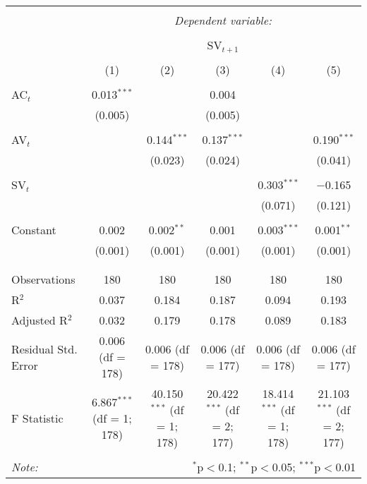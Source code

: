 
\begin{table}[!htbp] \centering 
  \caption{} 
  \label{} 
\begin{tabular}{@{\extracolsep{5pt}}lccccc} 
\\[-1.8ex]\hline 
\hline \\[-1.8ex] 
 & \multicolumn{5}{c}{\textit{Dependent variable:}} \\ 
\cline{2-6} 
\\[-1.8ex] & \multicolumn{5}{c}{SV$_{t+1}$} \\ 
\\[-1.8ex] & (1) & (2) & (3) & (4) & (5)\\ 
\hline \\[-1.8ex] 
 AC$_{t}$ & 0.013$^{***}$ &  & 0.004 &  &  \\ 
  & (0.005) &  & (0.005) &  &  \\ 
  & & & & & \\ 
 AV$_{t}$ &  & 0.144$^{***}$ & 0.137$^{***}$ &  & 0.190$^{***}$ \\ 
  &  & (0.023) & (0.024) &  & (0.041) \\ 
  & & & & & \\ 
 SV$_{t}$ &  &  &  & 0.303$^{***}$ & $-$0.165 \\ 
  &  &  &  & (0.071) & (0.121) \\ 
  & & & & & \\ 
 Constant & 0.002 & 0.002$^{**}$ & 0.001 & 0.003$^{***}$ & 0.001$^{**}$ \\ 
  & (0.001) & (0.001) & (0.001) & (0.001) & (0.001) \\ 
  & & & & & \\ 
\hline \\[-1.8ex] 
Observations & 180 & 180 & 180 & 180 & 180 \\ 
R$^{2}$ & 0.037 & 0.184 & 0.187 & 0.094 & 0.193 \\ 
Adjusted R$^{2}$ & 0.032 & 0.179 & 0.178 & 0.089 & 0.183 \\ 
Residual Std. Error & 0.006 (df = 178) & 0.006 (df = 178) & 0.006 (df = 177) & 0.006 (df = 178) & 0.006 (df = 177) \\ 
F Statistic & 6.867$^{***}$ (df = 1; 178) & 40.150$^{***}$ (df = 1; 178) & 20.422$^{***}$ (df = 2; 177) & 18.414$^{***}$ (df = 1; 178) & 21.103$^{***}$ (df = 2; 177) \\ 
\hline 
\hline \\[-1.8ex] 
\textit{Note:}  & \multicolumn{5}{r}{$^{*}$p$<$0.1; $^{**}$p$<$0.05; $^{***}$p$<$0.01} \\ 
\end{tabular} 
\end{table} 
